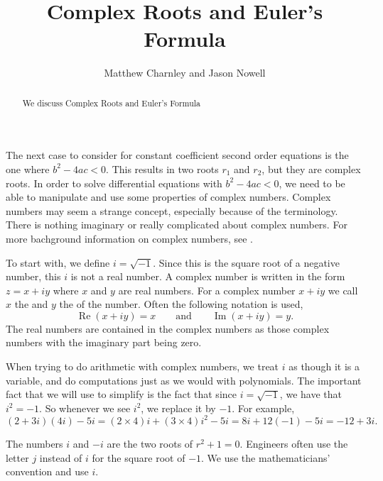 \documentclass{ximera}
\title{Complex Roots and Euler's Formula}
\author{Matthew Charnley and Jason Nowell}
\begin{document}
\begin{abstract}
    We discuss Complex Roots and Euler's Formula
\end{abstract}
\maketitle

\label{complexroots:section}



The next case to consider for constant coefficient second order equations is the one where $b^2 - 4ac < 0$. This results in two roots $r_1$ and $r_2$, but they are complex roots. In order to solve differential equations with $b^2 - 4ac < 0$, we need to be able to manipulate and use some properties of complex numbers. Complex numbers may seem a strange concept, especially because of the terminology.  There is nothing imaginary or really complicated about complex numbers. For more bachground information on complex numbers, see .

To start with, we define $i = \sqrt{-1}$. Since this is the square root of a negative number, this $i$ is not a real number. A complex number is written in the form $z = x+iy$ where $x$ and $y$ are real numbers. For a complex number $x+iy$ we call $x$ the \emph{} and $y$ the \emph{} of the number. Often the following notation is used,
\begin{equation*}
    \operatorname{Re}(x+iy) = x \qquad \text{and} \qquad \operatorname{Im}(x+iy) = y.
\end{equation*}
The real numbers are contained in the complex numbers as those complex numbers with the imaginary part being zero. 

When trying to do arithmetic with complex numbers, we treat $i$ as though it is a variable, and do computations just as we would with polynomials. The important fact that we will use to simplify is the fact that since $i = \sqrt{-1}$, we have that $i^2 = -1$. So whenever we see $i^2$, we replace it by $-1$. For example,
\begin{equation*}
    (2+3i)(4i) - 5i =  (2\times 4)i + (3 \times 4) i^2 - 5i = 8i + 12 (-1) - 5i = -12 + 3i .
\end{equation*}

The numbers $i$ and $-i$ are the two roots of $r^2 + 1 = 0$. Engineers often use the letter $j$ instead of $i$ for the square root of $-1$.  We use the mathematicians' convention and use $i$.
\end{document}
